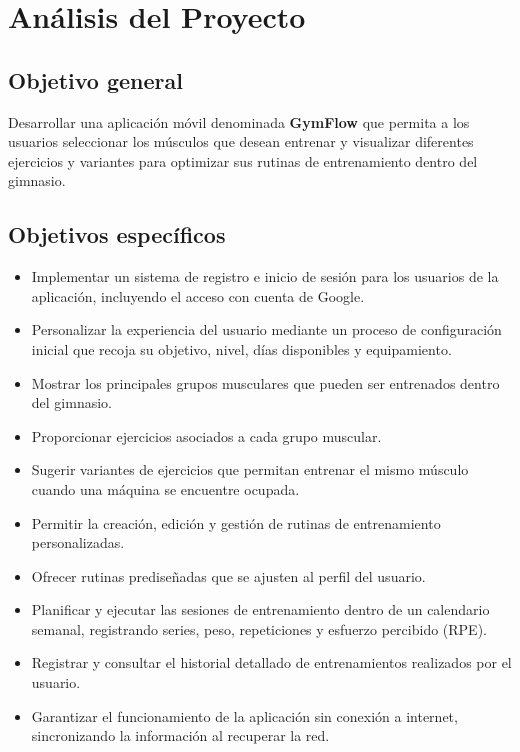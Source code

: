 \section{Análisis del Proyecto}

\subsection{Objetivo general}

Desarrollar una aplicación móvil denominada \textbf{GymFlow} que permita a los usuarios seleccionar los músculos que desean entrenar y visualizar diferentes ejercicios y variantes para optimizar sus rutinas de entrenamiento dentro del gimnasio.

\subsection{Objetivos específicos}

\begin{itemize}
    \item Implementar un sistema de registro e inicio de sesión para los usuarios de la aplicación, incluyendo el acceso con cuenta de Google.
    \item Personalizar la experiencia del usuario mediante un proceso de configuración inicial que recoja su objetivo, nivel, días disponibles y equipamiento.
    \item Mostrar los principales grupos musculares que pueden ser entrenados dentro del gimnasio.
    \item Proporcionar ejercicios asociados a cada grupo muscular.
    \item Sugerir variantes de ejercicios que permitan entrenar el mismo músculo cuando una máquina se encuentre ocupada.
    \item Permitir la creación, edición y gestión de rutinas de entrenamiento personalizadas.
    \item Ofrecer rutinas prediseñadas que se ajusten al perfil del usuario.
    \item Planificar y ejecutar las sesiones de entrenamiento dentro de un calendario semanal, registrando series, peso, repeticiones y esfuerzo percibido (RPE).
    \item Registrar y consultar el historial detallado de entrenamientos realizados por el usuario.
    \item Garantizar el funcionamiento de la aplicación sin conexión a internet, sincronizando la información al recuperar la red.
\end{itemize}

